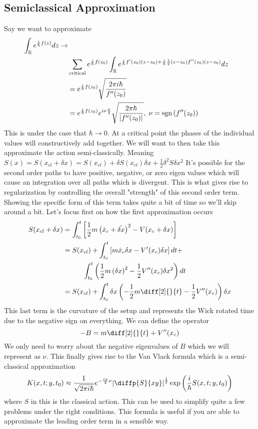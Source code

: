 \subsection{Semiclassical Approximation}
Say we want to approximate
\begin{align*}
    \int_{\mathbb{R}} e^{\frac{i}{\hbar} f(z)} dz \rightarrow \\
    & \sum_{\text{critical}} e^{\frac{i}{\hbar} f(z_0)}
        \int_{\mathbb{R}} e^{\frac{i}{\hbar} f'(z_0) (z - z_0) +
            \frac{i}{\hbar} \frac{1}{2} (z - z_0) f''(z_0) (z - z_0)} dz \\
    &= e^{\frac{i}{\hbar} f(z_0)}
        \sqrt{\frac{2 \pi i \hbar }{f''(z_0)}} \\
    &= e^{\frac{i}{\hbar} f(z_0)}
        e^{i \nu \frac{\pi}{4}}
        \sqrt{\frac{2 \pi \hbar}{\abs*{f''(z_0)}}}, \; \nu = \text{sgn} \left(f''(z_0)\right)
\end{align*}
This is under the case that $\hbar \to 0$. At a critical point the phases of the
individual values will constructively add together. We will want to then take this
approximate the action semi-classically. Meaning
$S(x) = S(x_{cl} + \delta x) = S(x_{cl}) + \delta S(x_{cl}) \delta x + 
\frac{1}{2} \delta^2 S \delta x^2$
It's possible for the second order paths to have positive, negative, or zero eigen values
which will cause an integration over all paths which is divergent. This is what gives rise to
regularization by controlling the overall "strength" of this second order term. Showing the
specific form of this term takes quite a bit of time so we'll skip around a bit. Let's
focus first on how the first approximation occurs
\begin{align*}
    S(x_{cl} + \delta x)
    &= \int_{t_0}^{t} \left[
        \frac{1}{2} m  \left(\dot{x}_c + \dot{\delta x}\right)^2 -
        V (x_c + \delta x)
        \right] \\
    &= S(x_{cl}) + \int_{t_0}^{t} \left[m \dot{x}_c \delta x - V'(x_c) \delta x\right] dt +
    \\&\hspace{1cm}
        \int_{t_0}^{t} \left(\frac{1}{2} m \left(\delta x\right)^2 - 
        \frac{1}{2} V''(x_c) \delta x^2\right) dt \\
    &= S(x_{cl}) + \int_{t_0}^{t}
        \delta x \left(-\frac{1}{2} m \diff[2]{}{t} - \frac{1}{2} V''(x_c)\right) \delta x
\end{align*}
This last term is the curvature of the setup and represents the Wick rotated time due to the
negative sign on everything. We can define the operator
$$
    -B = m \diff[2]{}{t} + V''(x_c)
$$
We only need to worry about the negative eigenvalues of $B$ which we will represent as
$\nu$. This finally gives rise to the Van Vlack formula which is a semi-classical approximation
$$
    K(x, t; y, t_0) \approx \frac{1}{\sqrt{2 \pi i \hbar}}
        e^{- \frac{i \pi}{2} \nu}
        \abs*{\diffp{S}{{x}{y}}}^{\frac{1}{2}}
        \exp \left(\frac{i}{\hbar} S(x, t; y, t_0)\right)
$$
where $S$ in this is the classical action. This can be used to simplify quite a few
problems under the right conditions. This formula is useful if you are able to approximate
the leading order term in a sensible way. 

